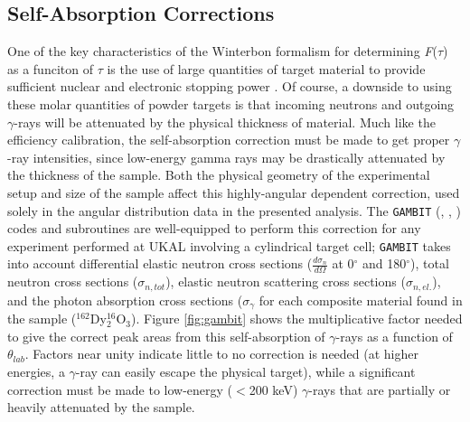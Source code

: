 \subsection{Self-Absorption Corrections}\label{sec:gambit_correction}
One of the key characteristics of the Winterbon formalism for determining \textit{F}(\textit{$\tau$}) as a funciton of \textit{$\tau$} is the use of large quantities of target material to provide sufficient nuclear and electronic stopping power \cite{WINTERBON_1975}. Of course, a downside to using these molar quantities of powder targets is that incoming neutrons and outgoing $\gamma$-rays will be attenuated by the physical thickness of material. Much like the efficiency calibration, the self-absorption correction must be made to get proper $\gamma$-ray intensities, since low-energy gamma rays may be drastically attenuated by the thickness of the sample. Both the physical geometry of the experimental setup and size of the sample affect this highly-angular dependent correction, used solely in the angular distribution data in the presented analysis. The {\tt GAMBIT} (\cite{ENGELBRECHT1970187}, \cite{CONTE_NUMERICAL_text}, \cite{GAMBIT_BORING1960}) codes and subroutines are well-equipped to perform this correction for any experiment performed at UKAL involving a cylindrical target cell; {\tt GAMBIT} takes into account differential elastic neutron cross sections (\textit{$\frac{d\sigma_n}{d\Omega}$} at 0$^\circ$ and 180$^\circ$), total neutron cross sections ($\sigma_{n,\textit{tot}}$), elastic neutron scattering cross sections ($\sigma_{n,\textit{el.}}$), and the photon absorption cross sections ($\sigma_{\gamma}$ for each composite material found in the sample ($^{162}$Dy$_2^{16}$O$_3$). Figure \ref{fig:gambit} shows the multiplicative factor needed to give the correct peak areas from this self-absorption of $\gamma$-rays as a function of $\theta_{lab}$. Factors near unity indicate little to no correction is needed (at higher energies, a $\gamma$-ray can easily escape the physical target), while a significant correction must be made to low-energy ($<$200 keV) $\gamma$-rays that are partially or heavily attenuated by the sample. 

